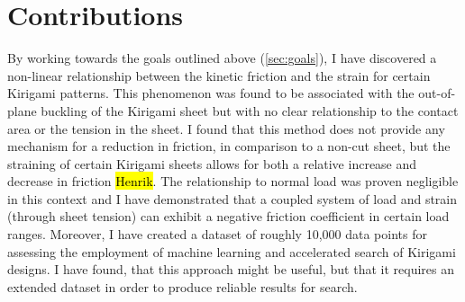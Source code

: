 






\section{Contributions}
By working towards the goals outlined above (\cref{sec:goals}), I have
discovered a non-linear relationship between the kinetic friction and the strain
for certain Kirigami patterns. This phenomenon was found to be associated with
the out-of-plane buckling of the Kirigami sheet but with no clear relationship
to the contact area or the tension in the sheet. I found that this method does
not provide any mechanism for a reduction in friction, in comparison to a
non-cut sheet, but the straining of certain Kirigami sheets allows for both a
relative increase and decrease in friction \hl{Henrik}. The relationship to normal load was proven
negligible in this context and I have demonstrated that a coupled system
of load and strain (through sheet tension) can exhibit a negative friction
coefficient in certain load ranges. Moreover, I have created a dataset of roughly 10,000 data points for assessing the employment of machine learning and accelerated search of Kirigami designs. I have found, that this approach might be useful, but that it requires an extended dataset in order to produce reliable results for search.

